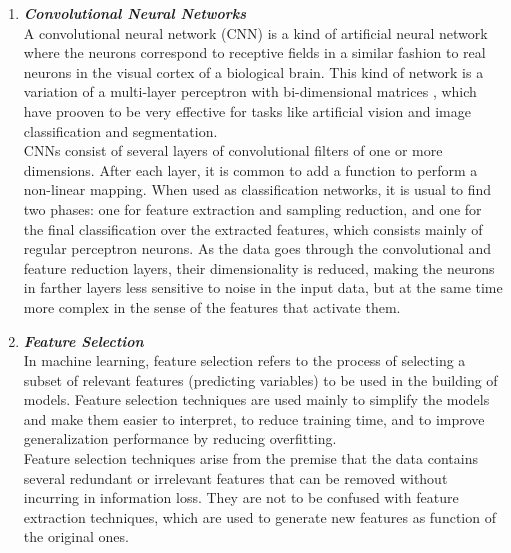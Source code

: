 \documentclass{article}
\begin{document}
\begin{enumerate}[label=(\alph*)]
\begin{enumerate}[label=\textbf{\arabic*.}]
            \item \textbf{\textit{Convolutional Neural Networks}}\\
A convolutional neural network (CNN) is a kind of artificial neural network where the neurons correspond to receptive fields in a similar fashion to real neurons in the visual cortex of a biological brain. This kind of network is a variation of a multi-layer perceptron with bi-dimensional matrices , which have prooven to be very effective for tasks like artificial vision and image classification and segmentation.\\
CNNs consist of several layers of convolutional filters of one or more dimensions. After each layer, it is common to add a function to perform a non-linear mapping. When used as classification networks, it is usual to find two phases: one for feature extraction and sampling reduction, and one for the final classification over the extracted features, which consists mainly of regular perceptron neurons. As the data goes through the convolutional and feature reduction layers, their dimensionality is reduced, making the neurons in farther layers less sensitive to noise in the input data, but at the same time more complex in the sense of the features that activate them.

            \item \textbf{\textit{Feature Selection}}\\
In machine learning, feature selection refers to the process of selecting a subset of relevant features (predicting variables) to be used in the building of models. Feature selection techniques are used mainly to simplify the models and make them easier to interpret, to reduce training time, and to improve generalization performance by reducing overfitting.\\
Feature selection techniques arise from the premise that the data contains several redundant or irrelevant features that can be removed without incurring in information loss. They are not to be confused with feature extraction techniques, which are used to generate new features as function of the original ones.
            

\end{enumerate}
\end{enumerate}
\end{document}
